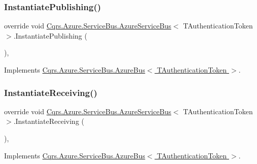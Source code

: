 \subsubsection{\texorpdfstring{Instantiate\+Publishing()}{InstantiatePublishing()}}
{\footnotesize\ttfamily override void \hyperlink{classCqrs_1_1Azure_1_1ServiceBus_1_1AzureServiceBus}{Cqrs.\+Azure.\+Service\+Bus.\+Azure\+Service\+Bus}$<$ T\+Authentication\+Token $>$.Instantiate\+Publishing (\begin{DoxyParamCaption}{ }\end{DoxyParamCaption})\hspace{0.3cm}{\ttfamily [protected]}, {\ttfamily [virtual]}}



Implements \hyperlink{classCqrs_1_1Azure_1_1ServiceBus_1_1AzureBus_a0bacaa4619921333da4a27371c1d6d0a}{Cqrs.\+Azure.\+Service\+Bus.\+Azure\+Bus$<$ T\+Authentication\+Token $>$}.

\mbox{\label{classCqrs_1_1Azure_1_1ServiceBus_1_1AzureServiceBus_ad49a2d063279ec98443e7f1d69178cfa}} 
\subsubsection{\texorpdfstring{Instantiate\+Receiving()}{InstantiateReceiving()}\hspace{0.1cm}{\footnotesize\ttfamily [1/2]}}
{\footnotesize\ttfamily override void \hyperlink{classCqrs_1_1Azure_1_1ServiceBus_1_1AzureServiceBus}{Cqrs.\+Azure.\+Service\+Bus.\+Azure\+Service\+Bus}$<$ T\+Authentication\+Token $>$.Instantiate\+Receiving (\begin{DoxyParamCaption}{ }\end{DoxyParamCaption})\hspace{0.3cm}{\ttfamily [protected]}, {\ttfamily [virtual]}}



Implements \hyperlink{classCqrs_1_1Azure_1_1ServiceBus_1_1AzureBus_ac9f66dd531dcde49be72ba8f2cb28e9b}{Cqrs.\+Azure.\+Service\+Bus.\+Azure\+Bus$<$ T\+Authentication\+Token $>$}.

